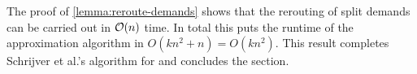 The proof of \cref{lemma:reroute-demands} shows that the rerouting of split demands can be carried out in $\mathcal{O}(n)$ time.
In total this puts the runtime of the approximation algorithm in $O(k n^2 + n) = O(k n^2)$. 
This result completes Schrijver et al.'s algorithm for \RL and concludes the section.
